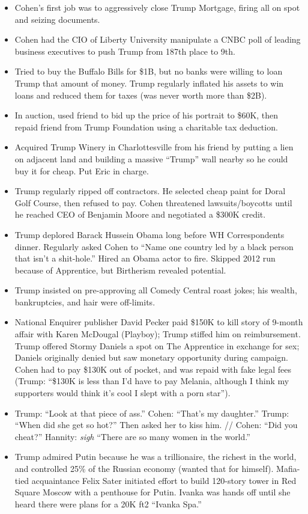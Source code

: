 \documentclass[
]{article}
\begin{document}
\begin{itemize}
\item
  Cohen's first job was to aggressively close Trump Mortgage, firing all
  on spot and seizing documents.
\item
  Cohen had the CIO of Liberty University manipulate a CNBC poll of
  leading business executives to push Trump from 187th place to 9th.
\item
  Tried to buy the Buffalo Bills for \$1B, but no banks were willing to
  loan Trump that amount of money. Trump regularly inflated his assets
  to win loans and reduced them for taxes (was never worth more than
  \$2B).
\item
  In auction, used friend to bid up the price of his portrait to \$60K,
  then repaid friend from Trump Foundation using a charitable tax
  deduction.
\item
  Acquired Trump Winery in Charlottesville from his friend by putting a
  lien on adjacent land and building a massive ``Trump'' wall nearby so
  he could buy it for cheap. Put Eric in charge.
\item
  Trump regularly ripped off contractors. He selected cheap paint for
  Doral Golf Course, then refused to pay. Cohen threatened
  lawsuits/boycotts until he reached CEO of Benjamin Moore and
  negotiated a \$300K credit.
\item
  Trump deplored Barack Hussein Obama long before WH Correspondents
  dinner. Regularly asked Cohen to ``Name one country led by a black
  person that isn't a shit-hole.'' Hired an Obama actor to fire. Skipped
  2012 run because of Apprentice, but Birtherism revealed potential.
\item
  Trump insisted on pre-approving all Comedy Central roast jokes; his
  wealth, bankruptcies, and hair were off-limits.
\item
  National Enquirer publisher David Pecker paid \$150K to kill story of
  9-month affair with Karen McDougal (Playboy); Trump stiffed him on
  reimbursement. Trump offered Stormy Daniels a spot on The Apprentice
  in exchange for sex; Daniels originally denied but saw monetary
  opportunity during campaign. Cohen had to pay \$130K out of pocket,
  and was repaid with fake legal fees (Trump: ``\$130K is less than I'd
  have to pay Melania, although I think my supporters would think it's
  cool I slept with a porn star'').
\item
  Trump: ``Look at that piece of ass.'' Cohen: ``That's my daughter.''
  Trump: ``When did she get so hot?'' Then asked her to kiss him. //
  Cohen: ``Did you cheat?'' Hannity: \emph{sigh} ``There are so many
  women in the world.''
\item
  Trump admired Putin because he was a trillionaire, the richest in the
  world, and controlled 25\% of the Russian economy (wanted that for
  himself). Mafia-tied acquaintance Felix Sater initiated effort to
  build 120-story tower in Red Square Moscow with a penthouse for Putin.
  Ivanka was hands off until she heard there were plans for a 20K ft2
  ``Ivanka Spa.''
\end{itemize}
\end{document}
